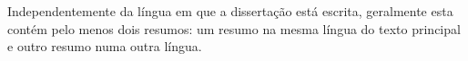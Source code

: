 
%

Independentemente da língua em que a dissertação está escrita, geralmente esta contém pelo menos dois resumos: um resumo na mesma língua do texto principal e outro resumo numa outra língua.

%

%
%

